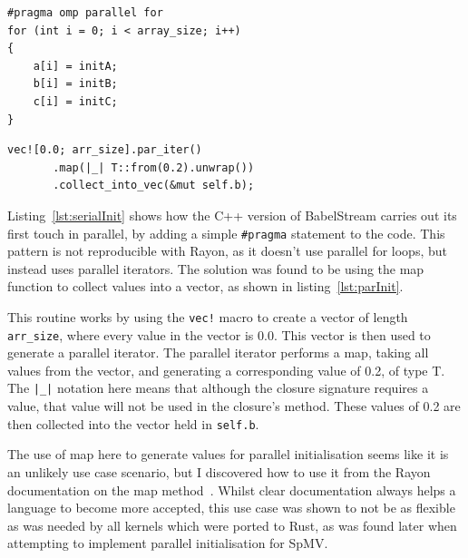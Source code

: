 \noindent\begin{minipage}{.49\textwidth}
\begin{code}
\begin{verbatim}
#pragma omp parallel for
for (int i = 0; i < array_size; i++)
{
    a[i] = initA;
    b[i] = initB;
    c[i] = initC;
}
\end{verbatim}
\label{lst:serialInit}
\end{code}
\end{minipage}\hfill
\begin{minipage}{.49\textwidth}
\begin{code}
\begin{verbatim}
vec![0.0; arr_size].par_iter()
       .map(|_| T::from(0.2).unwrap())
       .collect_into_vec(&mut self.b);
\end{verbatim}
\label{lst:parInit}
\end{code}
\end{minipage}

Listing~\ref{lst:serialInit} shows how the C++ version of BabelStream carries out its first touch in parallel, by adding a simple \texttt{\#pragma} statement to the code. This pattern is not reproducible with Rayon, as it doesn't use parallel for loops, but instead uses parallel iterators. The solution was found to be using the map function to collect values into a vector, as shown in listing~\ref{lst:parInit}.

This routine works by using the \texttt{vec!} macro to create a vector of length \texttt{arr\_size}, where every value in the vector is 0.0. This vector is then used to generate a parallel iterator. The parallel iterator performs a map, taking all values from the vector, and generating a corresponding value of 0.2, of type T. The \texttt{|\_|} notation here means that although the closure signature requires a value, that value will not be used in the closure's method.
These values of 0.2 are then collected into the vector held in \texttt{self.b}.

The use of map here to generate values for parallel initialisation seems like it is an unlikely use case scenario, but I discovered how to use it from the Rayon documentation on the map method~\cite{rayonMap}. Whilst clear documentation always helps a language to become more accepted, this use case was shown to not be as flexible as was needed by all kernels which were ported to Rust, as was found later when attempting to implement parallel initialisation for SpMV.

